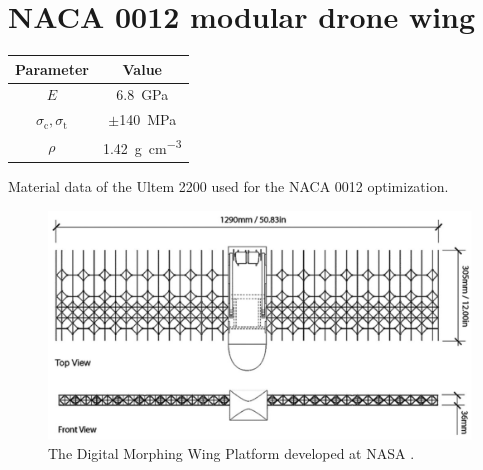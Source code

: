 \section{NACA 0012 modular drone wing} \label{sec:07_wing}
\begin{margintable}
    \small
    \centering
    \begin{tabular}{cc}
    \toprule
    \textbf{Parameter}        & \textbf{Value} \\ \midrule
    $E$              & \qty{6.8}{GPa}     \\
    $\sigma_\text{c}, \sigma_\text{t}$ & $\pm $\qty{140}{MPa} \\
    $\rho$              & \qty{1.42}{\gram\per\cubic\centi\metre}   \\
    \bottomrule
    \end{tabular}
    \caption{Material data of the Ultem 2200 used for the NACA 0012 optimization.}
    \label{tab:07_NACA_mat}
\end{margintable}
\begin{figure}
    \centering
    \includegraphics[width=0.8\linewidth]{figures/07_aeronautic/naca0012.png}
        \caption{The Digital Morphing Wing Platform developed at NASA \cite{jenett_digital_2017}.}
    \label{fig:07_naca0012}
\end{figure}

